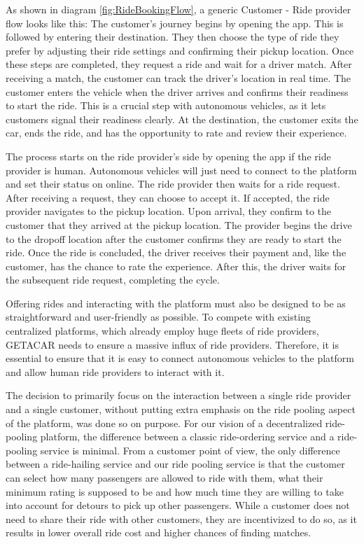 As shown in diagram \ref{fig:RideBookingFlow}, a generic Customer - Ride provider flow looks like this:
The customer's journey begins by opening the app. This is followed by entering their destination. They then choose the type of ride they prefer by adjusting their ride settings and confirming their pickup location. Once these steps are completed, they request a ride and wait for a driver match. After receiving a match, the customer can track the driver's location in real time. The customer enters the vehicle when the driver arrives and confirms their readiness to start the ride. This is a crucial step with autonomous vehicles, as it lets customers signal their readiness clearly. At the destination, the customer exits the car, ends the ride, and has the opportunity to rate and review their experience.

The process starts on the ride provider's side by opening the app if the ride provider is human. Autonomous vehicles will just need to connect to the platform and set their status on online. The ride provider then waits for a ride request. After receiving a request, they can choose to accept it. If accepted, the ride provider navigates to the pickup location. Upon arrival, they confirm to  the customer that they arrived at the pickup location. The provider begins the drive to the dropoff location after the customer confirms they are ready to start the ride. Once the ride is concluded, the driver receives their payment and, like the customer, has the chance to rate the experience. After this, the driver waits for the subsequent ride request, completing the cycle.

Offering rides and interacting with the platform must also be designed to be as straightforward and user-friendly as possible. To compete with existing centralized platforms, which already employ huge fleets of ride providers, GETACAR needs to ensure a massive influx of ride providers. Therefore, it is essential to ensure that it is easy to connect autonomous vehicles to the platform and allow human ride providers to interact with it. 

The decision to primarily focus on the interaction between a single ride provider and a single customer, without putting extra emphasis on the ride pooling aspect of the platform, was done so on purpose. For our vision of a decentralized ride-pooling platform, the difference between a classic ride-ordering service and a ride-pooling service is minimal. From a customer point of view, the only difference between a ride-hailing service and our ride pooling service is that the customer can select how many passengers are allowed to ride with them, what their minimum rating is supposed to be and how much time they are willing to take into account for detours to pick up other passengers. While a customer does not need to share their ride with other customers, they are incentivized to do so, as it results in lower overall ride cost and higher chances of finding matches. 

